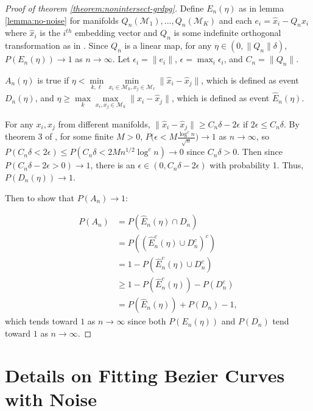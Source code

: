 \documentclass[12pt]{article}
\begin{document}
\begin{proof}[Proof of theorem \ref{theorem:nonintersect-grdpg}]
Define $E_n(\eta)$ as in lemma \ref{lemma:no-noise} for manifolds $Q_n(\mathcal{M}_1), ..., Q_n(\mathcal{M}_K)$ and each $e_i = \hat{x}_i - Q_n x_i$ where $\hat{x}_i$ is the $i^{th}$ embedding vector and $Q_n$ is some indefinite orthogonal transformation as in \citet{https://doi.org/10.1111/rssb.12509}. 
Since $Q_n$ is a linear map, for any $\eta \in (0, \|Q_n\| \delta)$, $P(E_n(\eta)) \to 1$ as $n \to \infty$. 
Let $\epsilon_i = \|e_i\|$, $\epsilon = \max_i \epsilon_i$, and $C_n = \|Q_n\|$. 

$A_n(\eta)$ is true if $\eta < \min\limits_{k, \ell} \min\limits_{x_i \in \mathcal{M}_k, x_j \in \mathcal{M}_\ell} \|\hat{x}_i - \hat{x}_j\|$, which is defined as event $D_n(\eta)$, and $\eta \geq \max\limits_k \max\limits_{x_i, x_j \in \mathcal{M}_k} \|\hat{x}_i - \hat{x}_j\|$, which is defined as event $\hat{E}_n(\eta)$.

For any $x_i, x_j$ from different manifolds, $\|\hat{x}_i - \hat{x}_j\| \geq C_n \delta - 2 \epsilon$ if $2 \epsilon \leq C_n \delta$. 
By theorem 3 of \citet{https://doi.org/10.1111/rssb.12509}, for some finite $M > 0$, $P \big(\epsilon < M \frac{\log^c n}{\sqrt{n}} \big) \to 1$ as $n \to \infty$, so $P(C_n \delta < 2 \epsilon) \leq P(C_n \delta < 2 M n^{1/2} \log^c n) \to 0$ since $C_n \delta > 0$. 
Then since $P(C_n \delta - 2 \epsilon > 0) \to 1$, there is an $\epsilon \in (0, C_n \delta - 2 \epsilon)$ with probability 1. 
Thus, $P(D_n(\eta)) \to 1$. 



Then to show that $P(A_n) \to 1$: 

$$
\begin{aligned}
P(A_n) & = P(\hat{E}_n(\eta) \cap D_n) \\
& = P((\hat{E}_n^c(\eta) \cup D_n^c)^c) \\
& = 1 - P(\hat{E}_n^c(\eta) \cup D_n^c) \\
& \geq 1 - P(\hat{E}_n^c(\eta)) - P(D_n^c) \\ 
& = P(\hat{E}_n(\eta)) + P(D_n) - 1,
\end{aligned}
$$
which tends toward $1$ as $n \to \infty$ since both $P(E_n(\eta))$ and $P(D_n)$ tend toward $1$ as $n \to \infty$. 
\end{proof}

\section{Details on Fitting Bezier Curves with Noise}


\renewcommand\refname{References}

\end{document}
